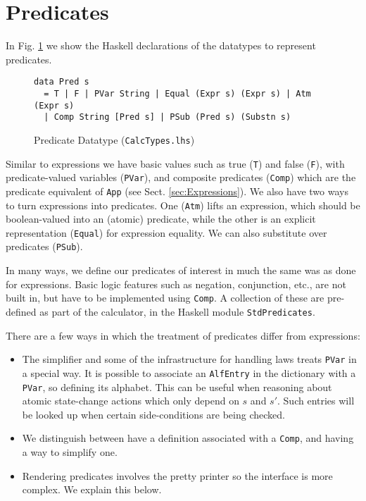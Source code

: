 \section{Predicates}\label{sec:Predicates}

In Fig. \ref{fig:pred-types} we show the Haskell declarations
of the datatypes to represent predicates.
\begin{figure}[tb]
\begin{verbatim}
data Pred s
  = T | F | PVar String | Equal (Expr s) (Expr s) | Atm (Expr s)
  | Comp String [Pred s] | PSub (Pred s) (Substn s)
\end{verbatim}
  \caption{Predicate Datatype (\texttt{CalcTypes.lhs})}
  \label{fig:pred-types}
\end{figure}

Similar to expressions we have basic values such as true (\texttt{T})
and false (\texttt{F}),
 with predicate-valued variables (\texttt{PVar}),
and composite predicates (\texttt{Comp}) which are the predicate equivalent
of \texttt{App} (see Sect. \ref{sec:Expressions}).
We also have two ways to turn expressions into predicates.
One (\texttt{Atm}) lifts an expression, which should be boolean-valued
into an (atomic) predicate,
while the other is an explicit representation (\texttt{Equal})
for expression equality.
We can also substitute over predicates (\texttt{PSub}).

In many ways,
we define our predicates of interest
in much the same was as done for expressions.
Basic logic features such as negation, conjunction, etc.,
are not built in,
but have to be implemented using \texttt{Comp}.
A collection of these are pre-defined as part of the calculator,
in the Haskell module \texttt{StdPredicates}.

There are a few ways in which the treatment of predicates
differ from expressions:
\begin{itemize}
  \item
    The simplifier and some of the infrastructure for handling
    laws treats \texttt{PVar} in a special way.
    It is possible to associate an \texttt{AlfEntry} in the dictionary
    with a \texttt{PVar}, so defining its alphabet.
    This can be useful when reasoning about atomic state-change
    actions which only depend on $s$ and $s'$.
    Such entries will be looked up when certain
    side-conditions are being checked.
  \item
    We distinguish between have a definition associated with a \texttt{Comp},
    and having a way to simplify one.
  \item
    Rendering predicates involves the pretty printer
    so the interface is more complex.
    We explain this below.
\end{itemize}



